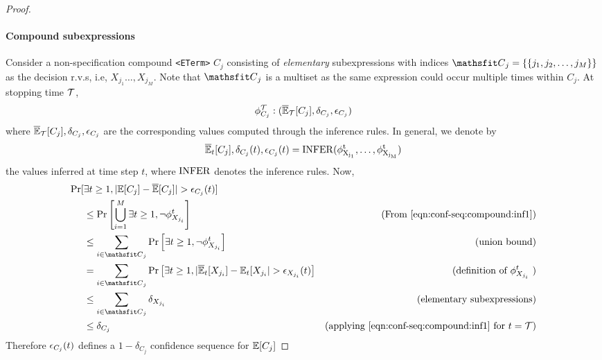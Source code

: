 \begin{proof}
\paragraph{Compound subexpressions} 
Consider a non-specification compound \texttt{<ETerm>} $C_j$ consisting of \textit{elementary} subexpressions with indices $\etC_j = \{\{j_1, j_2, \dots, j_{M}\}\}$ as the decision r.v.s, i.e, $X_{j_1} \dots, X_{j_{M}}$.
Note that $\etC_j$ is a multiset as the same expression could occur multiple times within $C_j$. 
At stopping time ${\mathcal{T}}$, 
\begin{equation}
    \phi_{C_j}^{\mathcal{T}}: (\overline{\mathbb{E}}_{\mathcal{T}}[C_j], \delta_{C_j}, {\epsilon}_{C_j})
\end{equation}
where $\overline{\mathbb{E}}_{\mathcal{T}}[C_j], \delta_{C_j}, {\epsilon}_{C_j}$ are the corresponding values computed through the inference rules.
In general, we denote by 
\begin{equation}
\overline{\mathbb{E}}_t[C_j], \delta_{C_j}(t), {\epsilon}_{C_j}(t) = \rm{INFER}(\phi^t_{X_{j_1}}, \dots, \phi^t_{X_{j_M}})
\label{eqn:conf-seq:compound:inf1}
\end{equation}
the values inferred at time step $t$, where $\rm{INFER}$ denotes the inference rules. 
Now,
\begin{align*}
    \Pr[&\exists t \geq 1, |\E[C_j] - \BarE[C_j]| > \eps_{C_j}(t)]\\
        &\leq \Pr\left[\bigcup\limits_{i = 1}^{M} \exists t \geq 1,  \neg \phi_{X_{j_i}}^t \right] & \text{(From \ref{eqn:conf-seq:compound:inf1})} \\
      &\leq \sum\limits_{i\in \etC_j}\Pr\left[\exists t \geq 1, \neg \phi^t_{X_{j_i}}\right] & \text{(union bound)} \\
      &= \sum\limits_{i\in \etC_j}\Pr\left[\exists t \geq 1, |\BarE_t[X_{j_i}] - \E_t[X_{j_i}| > \epsilon_{X_{j_i}}(t)\right] & \text{(definition of $\phi^t_{X_{j_i}}$ )} \\
      &\leq \sum\limits_{i\in \etC_j} \delta_{X_{j_i}} & \text{(elementary subexpressions)} \\
      &\leq \delta_{C_j} & \text{(applying \ref{eqn:conf-seq:compound:inf1} for $t = \gT$)}
\end{align*}
Therefore ${\epsilon}_{C_j}(t)$ defines a $1 - \delta_{C_j}$ confidence sequence for $\mathbb{E}[C_j]$


\end{proof}
